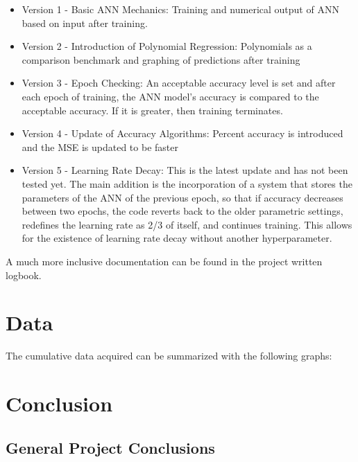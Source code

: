 \documentclass{article}
\begin{document}
\begin{itemize}
    \item Version 1 - Basic ANN Mechanics: Training and numerical output of ANN based on input after training.
    \item Version 2 - Introduction of Polynomial Regression: Polynomials as a comparison benchmark and graphing of predictions after training
    \item Version 3 - Epoch Checking: An acceptable accuracy level is set and after each epoch of training, the ANN model's accuracy is compared to the acceptable accuracy. If it is greater, then training terminates.
    \item Version 4 - Update of Accuracy Algorithms: Percent accuracy is introduced and the MSE is updated to be faster
    \item Version 5 - Learning Rate Decay: This is the latest update and has not been tested yet. The main addition is the incorporation of a system that stores the parameters of the ANN of the previous epoch, so that if accuracy decreases between two epochs, the code reverts back to the older parametric settings, redefines the learning rate as 2/3 of itself, and continues training. This allows for the existence of learning rate decay without another hyperparameter.
\end{itemize}

A much more inclusive documentation can be found in the project written logbook.

\section{Data}
The cumulative data acquired can be summarized with the following graphs:

\section{Conclusion}
\subsection{General Project Conclusions}
\end{document}

